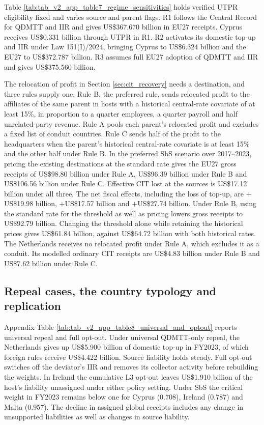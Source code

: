 \documentclass[11pt,a4paper]{article}
\newcommand{\usd}{US\$}
\begin{document}
Table \ref{tab:tab_v2_app_table7_regime_sensitivities} holds verified UTPR eligibility fixed and varies source and parent flags. R1 follows the Central Record for QDMTT and IIR and gives \usd367.670 billion in EU27 receipts. Cyprus receives \usd0.331 billion through UTPR in R1. R2 activates its domestic top-up and IIR under Law 151(I)/2024, bringing Cyprus to \usd6.324 billion and the EU27 to \usd372.787 billion. R3 assumes full EU27 adoption of QDMTT and IIR and gives \usd375.560 billion.

The relocation of profit in Section \ref{sec:cit_recovery} needs a destination, and three rules supply one. Rule B, the preferred rule, sends relocated profit to the affiliates of the same parent in hosts with a historical central-rate covariate of at least 15\%, in proportion to a quarter employees, a quarter payroll and half unrelated-party revenue. Rule A pools each parent's relocated profit and excludes a fixed list of conduit countries. Rule C sends half of the profit to the headquarters when the parent's historical central-rate covariate is at least 15\% and the other half under Rule B. In the preferred SbS scenario over 2017–2023, pricing the existing destinations at the standard rate gives the EU27 gross receipts of \usd98.80 billion under Rule A, \usd96.39 billion under Rule B and \usd106.56 billion under Rule C. Effective CIT lost at the sources is \usd17.12 billion under all three. The net fiscal effects, including the loss of top-up, are $+$\usd19.98 billion, $+$\usd17.57 billion and $+$\usd27.74 billion. Under Rule B, using the standard rate for the threshold as well as pricing lowers gross receipts to \usd92.79 billion. Changing the threshold alone while retaining the historical prices gives \usd61.84 billion, against \usd64.72 billion with both historical rates. The Netherlands receives no relocated profit under Rule A, which excludes it as a conduit. Its modelled ordinary CIT receipts are \usd4.83 billion under Rule B and \usd7.62 billion under Rule C.

\subsection{Repeal cases, the country typology and replication}\label{app:repeal_detail}

Appendix Table \ref{tab:tab_v2_app_table8_universal_and_optout} reports universal repeal and full opt-out. Under universal QDMTT-only repeal, the Netherlands gives up \usd5.900 billion of domestic top-up in FY2023, of which foreign rules receive \usd4.422 billion. Source liability holds steady. Full opt-out switches off the deviator's IIR and removes its collector activity before rebuilding the weights. In Ireland the cumulative L3 opt-out leaves \usd1.910 billion of the host's liability unassigned under either policy setting. Under SbS the critical weight in FY2023 remains below one for Cyprus (0.708), Ireland (0.787) and Malta (0.957). The decline in assigned global receipts includes any change in unsupported liabilities as well as changes in source liability.
\end{document}
